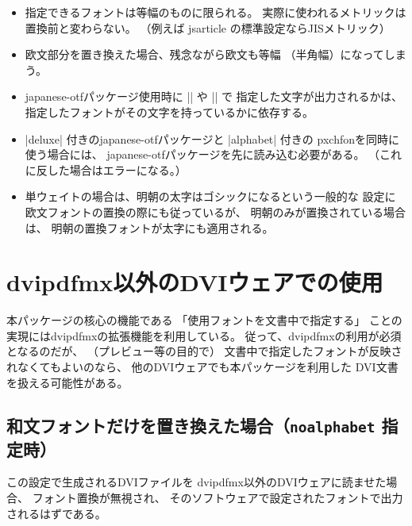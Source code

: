 \documentclass[uplatex,dvipdfmx,a4paper]{jsarticle}
\newcommand{\Pkg}[1]{\textsf{#1}}
\begin{document}
\begin{itemize}
\item 指定できるフォントは等幅のものに限られる。
  実際に使われるメトリックは置換前と変わらない。
  （例えば jsarticle の標準設定ならJISメトリック）
\item 欧文部分を置き換えた場合、残念ながら欧文も等幅
  （半角幅）になってしまう。
\item \Pkg{japanese-otf}パッケージ使用時に |\UTF| や |\CID| で
  指定した文字が出力されるかは、
  指定したフォントがその文字を持っているかに依存する。
\item |deluxe| 付きの\Pkg{japanese-otf}パッケージと |alphabet| 付きの
  \Pkg{pxchfon}を同時に使う場合には、
  \Pkg{japanese-otf}パッケージを先に読み込む必要がある。
  （これに反した場合はエラーになる。）
\item 単ウェイトの場合は、明朝の太字はゴシックになるという一般的な
  設定に欧文フォントの置換の際にも従っているが、
  明朝のみが置換されている場合は、
  明朝の置換フォントが太字にも適用される。
\end{itemize}

\appendix
\section{dvipdfmx以外のDVIウェアでの使用}
\label{sec:Other-Drivers}

本パッケージの核心の機能である
「使用フォントを文書中で指定する」
ことの実現にはdvipdfmxの拡張機能を利用している。
従って、dvipdfmxの利用が必須となるのだが、
（プレビュー等の目的で）
文書中で指定したフォントが反映されなくてもよいのなら、
他のDVIウェアでも本パッケージを利用した
DVI文書を扱える可能性がある。

\subsection{和文フォントだけを置き換えた場合（\texttt{noalphabet} 指定時）}

この設定で生成されるDVIファイルを
dvipdfmx以外のDVIウェアに読ませた場合、
フォント置換が無視され、
そのソフトウェアで設定されたフォントで出力されるはずである。
\end{document}
